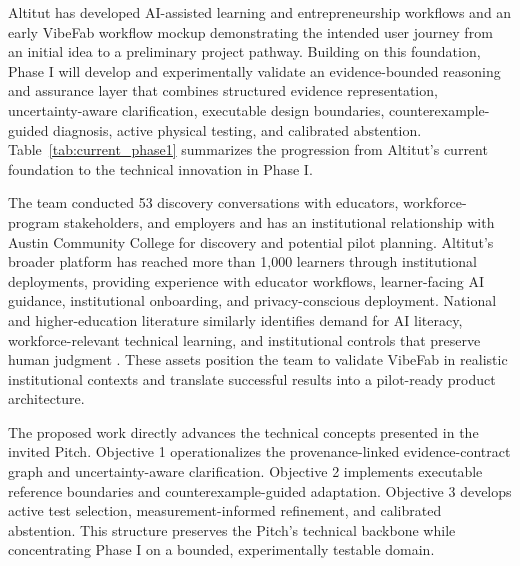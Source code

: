 \documentclass[11pt,letterpaper]{article}
\begin{document}

Altitut has developed AI-assisted learning and entrepreneurship workflows and an early VibeFab workflow mockup demonstrating the intended user journey from an initial idea to a preliminary project pathway. Building on this foundation, Phase I will develop and experimentally validate an evidence-bounded reasoning and assurance layer that combines structured evidence representation, uncertainty-aware clarification, executable design boundaries, counterexample-guided diagnosis, active physical testing, and calibrated abstention. Table~\ref{tab:current_phase1} summarizes the progression from Altitut's current foundation to the technical innovation in Phase I.

The team conducted 53 discovery conversations with educators, workforce-program stakeholders, and employers and has an institutional relationship with Austin Community College for discovery and potential pilot planning. Altitut's broader platform has reached more than 1,000 learners through institutional deployments, providing experience with educator workflows, learner-facing AI guidance, institutional onboarding, and privacy-conscious deployment. National and higher-education literature similarly identifies demand for AI literacy, workforce-relevant technical learning, and institutional controls that preserve human judgment \cite{usdoe2023ai,guthaus2023icworkforce,crompton2023highered,southworth2023aicurriculum}. These assets position the team to validate VibeFab in realistic institutional contexts and translate successful results into a pilot-ready product architecture.

The proposed work directly advances the technical concepts presented in the invited Pitch. Objective 1 operationalizes the provenance-linked evidence-contract graph and uncertainty-aware clarification. Objective 2 implements executable reference boundaries and counterexample-guided adaptation. Objective 3 develops active test selection, measurement-informed refinement, and calibrated abstention. This structure preserves the Pitch's technical backbone while concentrating Phase I on a bounded, experimentally testable domain.
\end{document}
